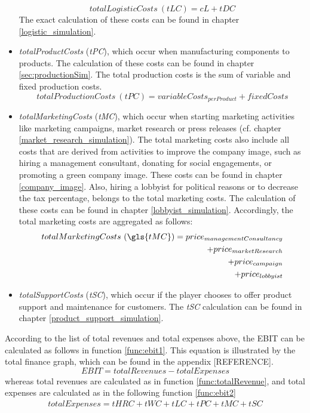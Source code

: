 \begin{itemize}
\begin{equation}
        totalLogisticCosts~(tLC) = cL + tDC
    \end{equation}
    The exact calculation of these costs can be found in chapter \ref{logistic_simulation}.
    \item \textit{totalProductCosts} (\textit{tPC}), which occur when manufacturing components to products. The calculation of these costs can be found in chapter \ref{sec:productionSim}. The total production costs is the sum of variable and fixed production costs.
   \begin{equation}
       totalProductionCosts~(tPC) = variableCosts_{perProduct} + fixedCosts
   \end{equation}
    \item \textit{totalMarketingCosts} (\textit{tMC}), which occur when starting marketing activities like marketing campaigns, market research or press releases (cf. chapter \ref{market_research_simulation}). The total marketing costs also include all costs that are derived from activities to improve the company image, such as hiring a management consultant, donating for social engagements, or promoting a green company image. These costs can be found in chapter \ref{company_image}. Also, hiring a lobbyist for political reasons or to decrease the tax percentage, belongs to the total marketing costs. The calculation of these costs can be found in chapter \ref{lobbyist_simulation}. Accordingly, the total marketing costs are aggregated as follows:
    \begin{equation}
    \begin{split}
        totalMarketingCosts~ (\gls{tMC}) = price_{managementConsultancy} \\
        + price_{marketResearch} \\
        + price_{campaign} \\
        + price_{lobbyist} \\
    \end{split}
    \end{equation}
    \item \textit{totalSupportCosts} (\textit{tSC}), which occur if the player chooses to offer product support and maintenance for customers. The \textit{tSC} calculation can be found in chapter \ref{product_support_simulation}.
\end{itemize}

According to the list of total revenues and total expenses above, the EBIT can be calculated as follows in function \ref{func:ebit1}. This equation is illustrated by the total finance graph, which can be found in the appendix [REFERENCE]. 
\begin{equation}
\label{func:ebit1}
    EBIT = totalRevenues - totalExpenses
\end{equation}
whereas total revenues are calculated as in function \ref{func:totalRevenue}, and total expenses are calculated as in the following function \ref{func:ebit2}
\begin{equation}
    \label{func:ebit2}
    \begin{aligned}
       totalExpenses = tHRC + tWC + tLC + tPC + tMC + tSC
    \end{aligned}
\end{equation}

